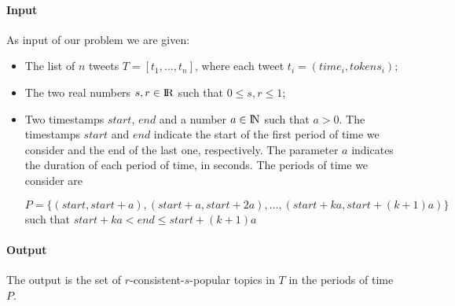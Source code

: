 \paragraph{Input}
As input of our problem we are given:
\begin{itemize}
    \item The list of $n$ tweets 
$T = [\mathit{t}_1, \dots, \mathit{t}_n]$, where each tweet
$\mathit{t}_i = (\mathit{time}_i, \mathit{tokens}_i)$;
    \item The two real numbers $s, r \in \rm I\!R$
    such that $0 \leq s, r \leq 1$;
    \item Two timestamps $\mathit{start}$, $\mathit{end}$ and a number $a \in \rm I\!N$
    such that $a > 0$.
    The timestamps $\mathit{start}$ and $\mathit{end}$ indicate the start of the first period 
    of time we consider and the end of the last one, respectively. The parameter
    $a$ indicates the duration of each period of time, in seconds.
    The periods of time we consider are

    $P = \{(\mathit{start}, \mathit{start} + a),
              (\mathit{start} + a, \mathit{start} + 2 a), 
    \dots , (\mathit{start} + k a, \mathit{start} + (k+1) a)\}$
    such that $\mathit{start} + k a < \mathit{end} \leq start + (k+1) a$

\end{itemize}

\paragraph{Output}

The output is the set of $r$-consistent-$s$-popular topics in $T$ in 
the periods of time $P$.

